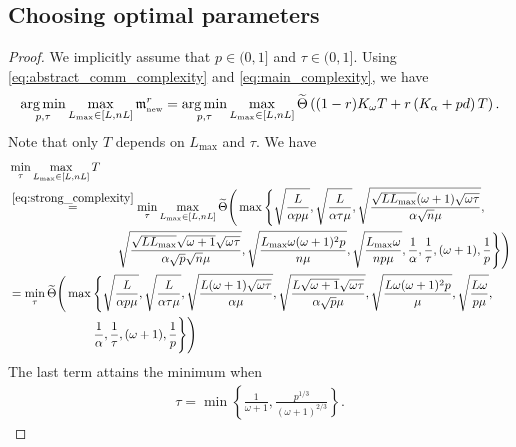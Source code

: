 \documentclass{article} %
\theoremstyle{plain}
\theoremstyle{definition}
\theoremstyle{remark}
\DeclareMathOperator*{\argmin}{arg\,min}%
\begin{document}
\subsection{Choosing optimal parameters}
\label{sec:opt_param}

\COROLLARYMAINREALISTIC*

\begin{proof}
    We implicitly assume that $p \in (0, 1]$ and $\tau \in (0, 1].$ Using \eqref{eq:abstract_comm_complexity} and \eqref{eq:main_complexity}, we have
    \begin{align*}
      \argmin_{p, \tau} \max\limits_{L_{\max} \in [L, n L]} \mathfrak{m}^{r}_{{\scriptscriptstyle \textnormal{new}}} = \argmin_{p, \tau} \max\limits_{L_{\max} \in [L, n L]} \widetilde{\Theta} \left((1 - r)K_{\omega} T + r \left(K_{\alpha} + p d\right) T\right).
    \end{align*}
    Note that only $T$ depends on $L_{\max}$ and $\tau.$ We have
    \begin{align*}
      &\min_{\tau} \max\limits_{L_{\max} \in [L, n L]} T \\
      &\overset{\eqref{eq:strong_complexity}}{=} \min_{\tau} \max\limits_{L_{\max} \in [L, n L]} \widetilde{\Theta}\Bigg(\max\Bigg\{\sqrt{\frac{L}{\alpha p \mu}},\sqrt{\frac{L}{\alpha \tau \mu}},\sqrt{\frac{\sqrt{L L_{\max}} (\omega + 1) \sqrt{\omega \tau}}{\alpha \sqrt{n} \mu}},\\
      & \qquad\quad \qquad \qquad \qquad \sqrt{\frac{\sqrt{L L_{\max}} \sqrt{\omega + 1} \sqrt{\omega \tau}}{\alpha \sqrt{p} \sqrt{n} \mu}},\sqrt{\frac{L_{\max} \omega (\omega + 1)^2 p}{n \mu}}, \sqrt{\frac{L_{\max} \omega}{n p \mu}}, \frac{1}{\alpha}, \frac{1}{\tau}, (\omega + 1), \frac{1}{p}\Bigg\}\Bigg) \\
      &= \min_{\tau} \widetilde{\Theta}\Bigg(\max\Bigg\{\sqrt{\frac{L}{\alpha p \mu}},\sqrt{\frac{L}{\alpha \tau \mu}},\sqrt{\frac{L (\omega + 1) \sqrt{\omega \tau}}{\alpha \mu}},\sqrt{\frac{L \sqrt{\omega + 1} \sqrt{\omega \tau}}{\alpha \sqrt{p} \mu}},\sqrt{\frac{L \omega (\omega + 1)^2 p}{\mu}}, \sqrt{\frac{L \omega}{p \mu}}, \\
      & \qquad\quad \qquad \qquad \frac{1}{\alpha}, \frac{1}{\tau}, (\omega + 1), \frac{1}{p}\Bigg\}\Bigg) \\
    \end{align*}
    The last term attains the minimum when 
    \begin{align}
    \label{eq:opt_tau}
    \tau = \min\left\{\frac{1}{\omega + 1}, \frac{p^{1/3}}{(\omega + 1)^{2/3}}\right\}.

\end{align}
\end{proof}
\end{document}
